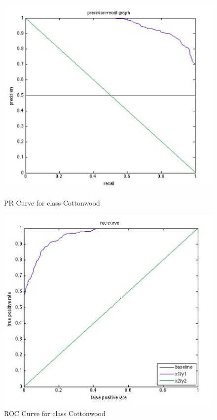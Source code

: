 \documentclass[11pt]{article}
\begin{document}
\begin{figure}[htbp]
\begin{minipage}[b]{0.5\linewidth}
\centering
\includegraphics[width=\linewidth]{CottonwoodPRCurve.png}
\caption{PR Curve for class Cottonwood}
\label{fig:chapter001_dist_001}
\end{minipage}
\hspace{0.5cm}
\begin{minipage}[b]{0.5\linewidth}
\centering
\includegraphics[width=\linewidth]{CottonwoodROCCurve.png}
\caption{ROC Curve for class Cottonwood}
\label{fig:chapter001_reward_001}
\end{minipage}
\end{figure}
\end{document}
